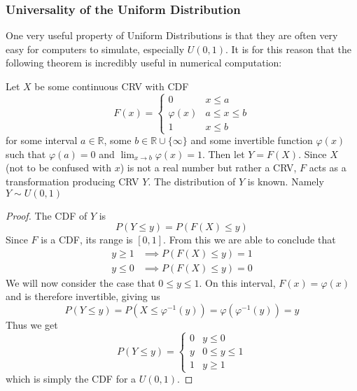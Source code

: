 \subsubsection{Universality of the Uniform Distribution}
One very useful property of Uniform Distributions is that they are often very easy for computers to simulate, especially $U(0,1)$. It is for this reason that the following theorem is incredibly useful in numerical computation:
\begin{theorem}
    Let $X$ be some continuous CRV with CDF 
    \[
        F(x)=\begin{cases}
            0 & x\le a
            \\
            \varphi(x) & a\le x \le b
            \\
            1 & x\le b
        \end{cases}
    \]
    for some interval $a\in\mathbb R$, some $b\in\mathbb R\cup\{\infty\}$ and some invertible function $\varphi(x)$ such that $\varphi(a)=0$ and $\lim_{x\to b}\varphi(x)=1$. Then let $Y=F(X)$. Since $X$ (not to be confused with $x$) is not a real number but rather a CRV, $F$ acts as a transformation producing CRV $Y$. The distribution of $Y$ is known. Namely $Y\sim U(0,1)$
    \begin{proof}
        The CDF of $Y$ is 
        \[
            P(Y\le y)= P(F(X)\le y)
        \]
        Since $F$ is a CDF, its range is $[0,1]$. From this we are able to conclude that 
        \begin{align*}
            y\ge 1 &\implies P(F(X)\le y)=1
            \\
            y\le 0 &\implies P(F(X)\le y)=0
        \end{align*}
        We will now consider the case that $0 \le y\le 1$. On this interval, $F(x)=\varphi(x)$ and is therefore invertible, giving us
        \[
            P(Y\le y)=P(X\le\varphi^{-1}(y))=\varphi(\varphi^{-1}(y))=y
        \]
        Thus we get
        \[
            P(Y\le y)=\begin{cases}
                0 & y \le 0
                \\
                y & 0\le y \le 1
                \\
                1 & y \ge 1
            \end{cases}
        \]
        which is simply the CDF for a $U(0,1)$.
    \end{proof}
\end{theorem}

